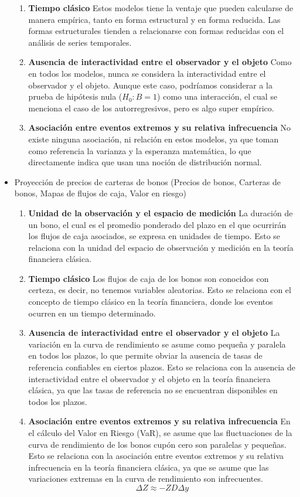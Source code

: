 \begin{problema}
\begin{sol}
\begin{itemize}
\begin{enumerate}
\item \textbf{Tiempo clásico}
Estos modelos tiene la ventaje que pueden calcularse de manera empírica, tanto en forma estructural y en forma reducida. Las formas estructurales tienden a relacionarse con  formas reducidas con el análisis de series temporales. 

\item \textbf{Ausencia de interactividad entre el observador y el objeto}
Como en todos los modelos, nunca se considera la interactividad entre el observador y el objeto. Aunque este caso, podríamos considerar  a la prueba de hipótesis nula ($H_0:B=1$) como una interacción, el cual se menciona el caso de los autorregresivos, pero es algo super empírico. 

\item \textbf{Asociación entre eventos extremos y su relativa infrecuencia}
No existe ninguna asociación, ni relación en estos modelos, ya que toman como referencia la varianza y la esperanza matemática, lo que directamente indica que usan una noción de distribución normal. 

\end{enumerate}


\item Proyección de precios de carteras de bonos (Precios de bonos, Carteras de
bonos, Mapas de flujos de caja, Valor en riesgo)
\begin{enumerate}
\item \textbf{Unidad de la observación y el espacio de medición}
La duración de un bono, el cual es el promedio ponderado del plazo en el que ocurrirán los flujos de caja asociados, se expresa en unidades de tiempo. Esto se relaciona con la unidad del espacio de observación y medición en la teoría financiera clásica.
\item \textbf{Tiempo clásico}
Los flujos de caja de los bonos son conocidos con certeza, es decir, no tenemos variables aleatorias. Esto se relaciona con el concepto de tiempo clásico en la teoría financiera, donde los eventos ocurren en un tiempo determinado. 
\item \textbf{Ausencia de interactividad entre el observador y el objeto}
La variación en la curva de rendimiento se asume como pequeña y paralela en todos los plazos, lo que permite obviar la ausencia de tasas de referencia confiables en ciertos plazos. Esto se relaciona con la ausencia de interactividad entre el observador y el objeto en la teoría financiera clásica, ya que las tasas de referencia no se encuentran disponibles en todos los plazos.
\item \textbf{Asociación entre eventos extremos y su relativa infrecuencia}
En el cálculo del Valor en Riesgo (VaR), se asume que las fluctuaciones de la curva de rendimiento de los bonos cupón cero son paralelas y pequeñas. Esto se relaciona con la asociación entre eventos extremos y su relativa infrecuencia en la teoría financiera clásica, ya que se asume que las variaciones extremas en la curva de rendimiento son infrecuentes.
$$\Delta Z\approx -ZD\Delta y $$
\end{enumerate}


\end{itemize}
\end{sol}
\end{problema}
